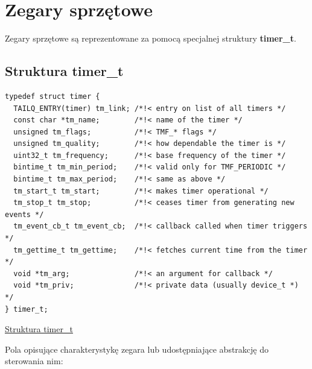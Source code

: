 \documentclass[shortabstract]{iithesis}
\theoremstyle{definition} \newtheorem*{definition}{Definicja}
\theoremstyle{definition} \newtheorem*{example}{Przykład}
\theoremstyle{definition} \newtheorem*{remark}{Uwaga}
\newenvironment{longlisting}{\captionsetup{type=listing}}{}
\begin{document}
\section{Zegary sprzętowe}
Zegary sprzętowe są reprezentowane za pomocą specjalnej struktury \textbf{timer\_t}.

\subsection{Struktura timer\_t}
\begin{longlisting}
  \begin{verbatim}
typedef struct timer {
  TAILQ_ENTRY(timer) tm_link; /*!< entry on list of all timers */
  const char *tm_name;        /*!< name of the timer */
  unsigned tm_flags;          /*!< TMF_* flags */
  unsigned tm_quality;        /*!< how dependable the timer is */
  uint32_t tm_frequency;      /*!< base frequency of the timer */
  bintime_t tm_min_period;    /*!< valid only for TMF_PERIODIC */
  bintime_t tm_max_period;    /*!< same as above */
  tm_start_t tm_start;        /*!< makes timer operational */
  tm_stop_t tm_stop;          /*!< ceases timer from generating new events */
  tm_event_cb_t tm_event_cb;  /*!< callback called when timer triggers */
  tm_gettime_t tm_gettime;    /*!< fetches current time from the timer */
  void *tm_arg;               /*!< an argument for callback */
  void *tm_priv;              /*!< private data (usually device_t *) */
} timer_t;
  \end{verbatim}
  \caption{\href{https://mimiker.ii.uni.wroc.pl/source/xref/mimiker/include/sys/timer.h?r=4b37e316\#42}{Struktura timer\_t}}
  \label{lst:structtimer}
\end{longlisting}

Pola opisujące charakterystykę zegara lub udostępniające abstrakcję do sterowania nim:
\end{document}
